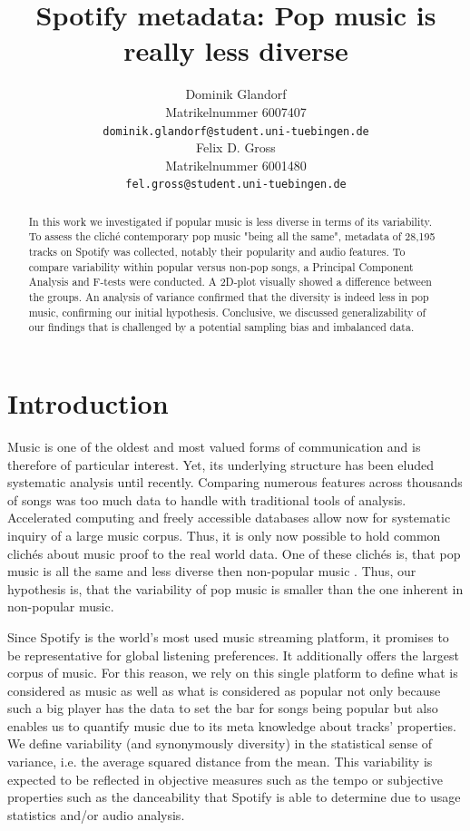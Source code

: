\documentclass{article}
\title{Spotify metadata: Pop music is really less diverse}
\author{%
  Dominik Glandorf\\
  Matrikelnummer 6007407\\
  \texttt{dominik.glandorf@student.uni-tuebingen.de} \\
  \And
  Felix D. Gross\\
  Matrikelnummer 6001480\\
  \texttt{fel.gross@student.uni-tuebingen.de} \\
}
\begin{document}
\maketitle

\begin{abstract}
In this work we investigated if popular music is less diverse in terms of its variability.
To assess the cliché contemporary pop music "being all the same",
metadata of 28,195 tracks on Spotify was collected, notably their popularity and audio features. To compare variability within popular versus non-pop songs, a Principal Component Analysis and F-tests were conducted.
A 2D-plot visually showed a difference between the groups. An analysis of variance confirmed that the diversity is indeed less in pop music, confirming our initial hypothesis.
Conclusive, we discussed generalizability of our findings that is challenged by a potential sampling bias and imbalanced data.
\end{abstract}

\section{Introduction}
Music is one of the oldest and most valued forms of communication and is therefore of particular interest. Yet, its underlying structure has been eluded systematic analysis until recently.
Comparing numerous features across thousands of songs was too much data to handle with traditional tools of analysis. Accelerated computing and freely accessible databases allow now for systematic inquiry of a large music corpus. Thus, it is only now possible to hold common clichés about music proof to the real world data.
One of these clichés is, that pop music is all the same and less diverse then non-popular music \citep{serra2012measuring}. Thus, our hypothesis is, that the variability of pop music is smaller than the one inherent in non-popular music.

Since Spotify is the world's most used music streaming platform, it promises to be representative for global listening preferences. It additionally offers the largest corpus of music. For this reason, we rely on this single platform to define what is considered as music as well as what is considered as popular not only because such a big player has the data to set the bar for songs being popular but also enables us to quantify music due to its meta knowledge about tracks' properties.
We define variability (and synonymously diversity) in the statistical sense of variance, i.e. the average squared distance from the mean. This variability is expected to be reflected in objective measures such as the tempo or subjective properties such as the danceability that Spotify is able to determine due to usage statistics and/or audio analysis.
\end{document}
